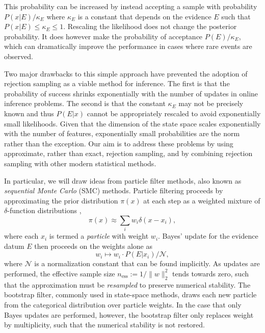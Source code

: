 \documentclass[twoside]{article}
\newcommand{\ess}{\mathrm{ess}}
\newcommand{\defeq}{\mathrel{:=}}
\begin{document}
This probability
can be increased by instead accepting a sample with probability $P(x|E)/\kappa_E$ where
$\kappa_E$ is a constant that depends on the evidence $E$ such that $P(x|E) \le \kappa_E \le 1$.
Rescaling the likelihood does not change the posterior probability.
It does however make the probability of acceptance $P(E)/\kappa_E$, which
can dramatically improve the performance in cases where rare events are observed.

Two major drawbacks to this simple approach have prevented the adoption
of rejection sampling as a viable method for inference.  The first is that the probability of success shrinks exponentially with the number of updates
in online inference problems.
The second  is that the constant $\kappa_E$ may not be precisely known and thus $P(E|x)$ cannot be appropriately rescaled to avoid exponentially small likelihoods.  Given that the dimension of the state
space scales exponentially with the number of features, exponentially small probabilities are the norm rather than the exception. 
Our aim is to address these problems
by using approximate, rather than exact, rejection sampling, and
by combining rejection sampling with other modern statistical methods.

In particular, we will draw ideas from particle filter methods, also known as \emph{sequential Monte Carlo} (SMC) methods. Particle filtering proceeds
by approximating the prior distribution $\pi(x)$ at each step as a weighted
mixture of $\delta$-function distributions \cite{doucet_introduction_2001},
\begin{equation}
    \pi(x) \approx \sum_i w_i \delta(x - x_i),
\end{equation}
where each $x_i$ is termed a \emph{particle} with weight $w_i$.
Bayes' update for the evidence datum $E$ then proceeds on the weights alone as
\begin{equation}
    w_i \mapsto w_i \cdot P(E | x_i) / \mathcal{N},
\end{equation}
where $\mathcal{N}$ is a normalization constant that can be found implicitly.
As updates are performed, the effective sample size $n_\ess \defeq
1 / \|w\|_2^2$ tends towards zero, such that the approximation must be
\emph{resampled} to preserve numerical stability. The bootstrap filter,
commonly used in state-space methods, draws each new particle from the categorical
distribution over particle weights. In the case that only Bayes updates are
performed, however, the bootstrap filter only replaces weight by multiplicity,
such that the numerical stability is not restored.
\end{document}
